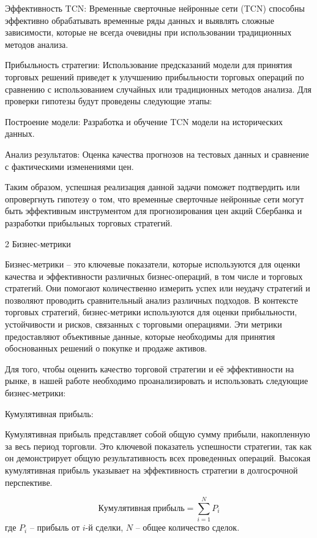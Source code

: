 Эффективность TCN: Временные сверточные нейронные сети (TCN) способны эффективно обрабатывать временные ряды данных и выявлять сложные зависимости, которые не всегда очевидны при использовании традиционных методов анализа.

Прибыльность стратегии: Использование предсказаний модели для принятия торговых решений приведет к улучшению прибыльности торговых операций по сравнению с использованием случайных или традиционных методов анализа.
Для проверки гипотезы будут проведены следующие этапы:

Построение модели: Разработка и обучение TCN модели на исторических данных.

Анализ результатов: Оценка качества прогнозов на тестовых данных и сравнение с фактическими изменениями цен.

Таким образом, успешная реализация данной задачи поможет подтвердить или опровергнуть гипотезу о том, что временные сверточные нейронные сети могут быть эффективным инструментом для прогнозирования цен акций Сбербанка и разработки прибыльных торговых стратегий.
\newpage
{}

2 Бизнес-метрики

Бизнес-метрики – это ключевые показатели, которые используются для оценки качества и эффективности различных бизнес-операций, в том числе и торговых стратегий. Они помогают количественно измерить успех или неудачу стратегий и позволяют проводить сравнительный анализ различных подходов. В контексте торговых стратегий, бизнес-метрики используются для оценки прибыльности, устойчивости и рисков, связанных с торговыми операциями. Эти метрики предоставляют объективные данные, которые необходимы для принятия обоснованных решений о покупке и продаже активов.

Для того, чтобы оценить качество торговой стратегии и её эффективности на рынке, в нашей работе необходимо проанализировать и использовать следующие бизнес-метрики:

Кумулятивная прибыль:


Кумулятивная прибыль представляет собой общую сумму прибыли, накопленную за весь период торговли.
Это ключевой показатель успешности стратегии, так как он демонстрирует общую результативность всех проведенных операций. Высокая кумулятивная прибыль указывает на эффективность стратегии в долгосрочной перспективе.

\[
\mathrm{Кумулятивная\ прибыль} = \sum_{i=1}^{N} P_i
\]
где \(P_i\) – прибыль от \(i\)-й сделки, \(N\) – общее количество сделок.

